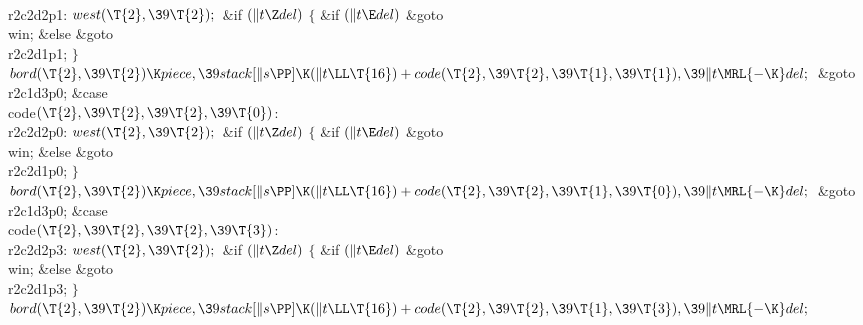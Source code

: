 \\{r2c2d2p1}:\5
${}\\{west}(\T{2},\39\T{2});{}$\6
\&{if} ${}(\|t\Z\\{del}){}$\5
${}\{{}$\5
\1\&{if} ${}(\|t\E\\{del}){}$\1\5
\&{goto} \\{win};\5
\2\&{else}\1\5
\&{goto} \\{r2c2d1p1};\5
\2${}\}{}$\2\6
${}\\{bord}(\T{2},\39\T{2})\K\\{piece},\39\\{stack}[\|s\PP]\K(\|t\LL\T{16})+%
\\{code}(\T{2},\39\T{2},\39\T{1},\39\T{1}),\39\|t\MRL{-{\K}}\\{del};{}$\6
\&{goto} \\{r2c1d3p0};\6
\4\&{case} \\{code}${}(\T{2},\39\T{2},\39\T{2},\39\T{0}){}$:\5
\\{r2c2d2p0}:\5
${}\\{west}(\T{2},\39\T{2});{}$\6
\&{if} ${}(\|t\Z\\{del}){}$\5
${}\{{}$\5
\1\&{if} ${}(\|t\E\\{del}){}$\1\5
\&{goto} \\{win};\5
\2\&{else}\1\5
\&{goto} \\{r2c2d1p0};\5
\2${}\}{}$\2\6
${}\\{bord}(\T{2},\39\T{2})\K\\{piece},\39\\{stack}[\|s\PP]\K(\|t\LL\T{16})+%
\\{code}(\T{2},\39\T{2},\39\T{1},\39\T{0}),\39\|t\MRL{-{\K}}\\{del};{}$\6
\&{goto} \\{r2c1d3p0};\6
\4\&{case} \\{code}${}(\T{2},\39\T{2},\39\T{2},\39\T{3}){}$:\5
\\{r2c2d2p3}:\5
${}\\{west}(\T{2},\39\T{2});{}$\6
\&{if} ${}(\|t\Z\\{del}){}$\5
${}\{{}$\5
\1\&{if} ${}(\|t\E\\{del}){}$\1\5
\&{goto} \\{win};\5
\2\&{else}\1\5
\&{goto} \\{r2c2d1p3};\5
\2${}\}{}$\2\6
${}\\{bord}(\T{2},\39\T{2})\K\\{piece},\39\\{stack}[\|s\PP]\K(\|t\LL\T{16})+%
\\{code}(\T{2},\39\T{2},\39\T{1},\39\T{3}),\39\|t\MRL{-{\K}}\\{del};{}$\6
